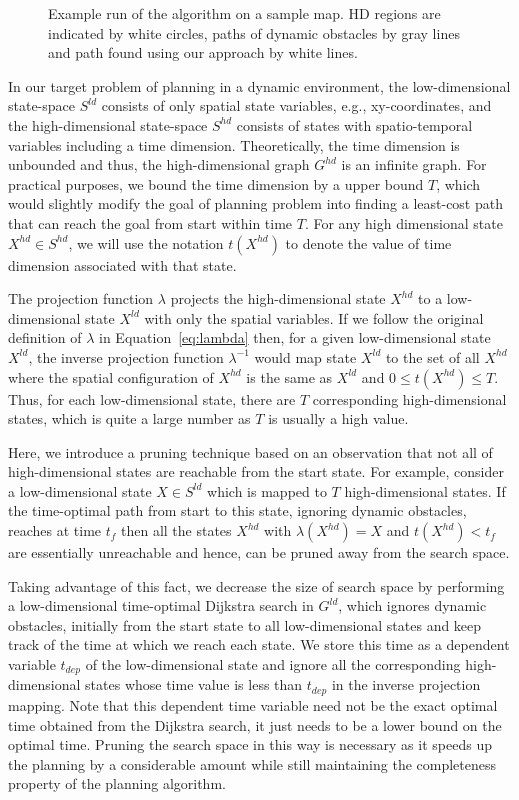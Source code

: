 \begin{figure}[ht]
  \caption{Example run of the algorithm on a sample map. HD regions are indicated by white circles, paths of dynamic obstacles by gray lines and path found using our approach by white lines.}
  \label{fig:alg}
\end{figure}

In our target problem of planning in a dynamic environment,
the low-dimensional state-space $S^{ld}$ consists of only spatial state variables, e.g., xy-coordinates, and the high-dimensional state-space $S^{hd}$ consists of states with spatio-temporal variables including a time dimension. Theoretically, the time dimension is unbounded and thus, the high-dimensional graph $G^{hd}$ is an infinite graph. For practical purposes, we bound the time dimension by a upper bound $T$, which would slightly modify the goal of planning problem into finding a least-cost path that can reach the goal from start within time $T$.
For any high dimensional state $X^{hd} \in S^{hd}$, we will use the notation $t(X^{hd})$ to denote the value of time dimension associated with that state. 

The projection function $\lambda$ projects the high-dimensional state $X^{hd}$ to a low-dimensional state $X^{ld}$ with only the spatial variables. 
If we follow the original definition of $\lambda$ in Equation~\ref{eq:lambda} then, for a given low-dimensional state $X^{ld}$, the inverse projection function $\lambda^{-1}$ would map state $X^{ld}$ to the set of all $X^{hd}$ where the spatial configuration of $X^{hd}$ is the same as $X^{ld}$ and $0 \leq t(X^{hd}) \leq T$. 
Thus, for each low-dimensional state, there are $T$ corresponding high-dimensional states, which is quite a large number as $T$ is usually a high value. 

Here, we introduce a pruning technique based on an observation that not all of high-dimensional states are reachable from the start state. For example, consider a low-dimensional state $X \in S^{ld}$ which is mapped to $T$ high-dimensional states. If the time-optimal path from start to this state, ignoring dynamic obstacles, reaches at time $t_f$ then all the states $X^{hd}$ with $\lambda(X^{hd}) = X$ and $t(X^{hd}) < t_f$ are essentially unreachable and hence, can be pruned away from the search space. 

Taking advantage of this fact, we decrease the size of search space by performing a low-dimensional time-optimal Dijkstra search in $G^{ld}$, which ignores dynamic obstacles, initially from the start state to all low-dimensional states and keep track of the time at which we reach each state. 
We store this time as a dependent variable $t_{dep}$ of the low-dimensional state and ignore all the corresponding high-dimensional states whose time value is less than $t_{dep}$ in the inverse projection mapping. 
Note that this dependent time variable need not be the exact optimal time obtained from the Dijkstra search, it just needs to be a lower bound on the optimal time. Pruning the search space in this way is necessary as it speeds up the planning by a considerable amount while still maintaining the completeness property of the planning algorithm. 


